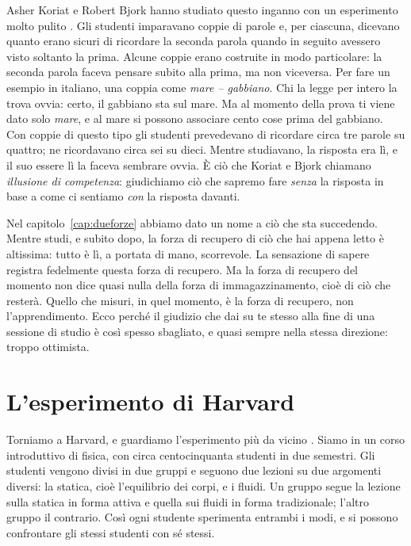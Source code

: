 Asher Koriat e Robert Bjork hanno studiato questo inganno con un
esperimento molto pulito \parencite{koriat2005}. Gli studenti
imparavano coppie di parole e, per ciascuna, dicevano quanto erano
sicuri di ricordare la seconda parola quando in seguito avessero
visto soltanto la prima. Alcune coppie erano costruite in modo
particolare: la seconda parola faceva pensare subito alla prima, ma non
viceversa. Per fare un esempio in italiano, una coppia come
\emph{mare -- gabbiano}. Chi la legge per intero la trova ovvia: certo,
il gabbiano sta sul mare. Ma al momento della prova ti viene dato solo
\emph{mare}, e al mare si possono associare cento cose prima del
gabbiano. Con coppie di questo tipo gli studenti prevedevano di
ricordare circa tre parole su quattro; ne ricordavano circa sei su
dieci. Mentre studiavano, la risposta era lì, e il suo essere lì la
faceva sembrare ovvia. È ciò che Koriat e Bjork chiamano
\emph{illusione di competenza}: giudichiamo ciò che sapremo fare
\emph{senza} la risposta in base a come ci sentiamo \emph{con} la
risposta davanti.

Nel capitolo~\ref{cap:dueforze} abbiamo dato un nome a ciò che sta
succedendo. Mentre studi, e subito dopo, la forza di recupero di ciò
che hai appena letto è altissima: tutto è lì, a portata di mano,
scorrevole. La sensazione di sapere registra fedelmente questa forza
di recupero. Ma la forza di recupero del momento non dice quasi nulla
della forza di immagazzinamento, cioè di ciò che resterà. Quello che
misuri, in quel momento, è la forza di recupero, non l'apprendimento.
Ecco perché il giudizio che dai su te stesso alla fine di una sessione
di studio è così spesso sbagliato, e quasi sempre nella stessa
direzione: troppo ottimista.

\section{L'esperimento di Harvard}

Torniamo a Harvard, e guardiamo l'esperimento più da vicino
\parencite{deslauriers2019}. Siamo in un corso introduttivo di fisica,
con circa centocinquanta studenti in due semestri. Gli studenti
vengono divisi in due gruppi e seguono due lezioni su due argomenti diversi: la statica, cioè
l'equilibrio dei corpi, e i fluidi. Un gruppo segue la lezione sulla
statica in forma attiva e quella sui fluidi in forma tradizionale;
l'altro gruppo il contrario. Così ogni studente sperimenta entrambi i
modi, e si possono confrontare gli stessi studenti con sé stessi.

